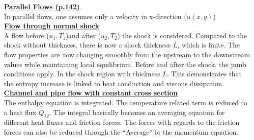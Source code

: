 \documentclass[8pt, landscape, fleqn]{scrartcl}
\begin{document}
\begin{multicols*}{3}
\underline{\textbf{Parallel Flows (p.142)}}\\
In parallel flows, one assumes only a velocity in x-direction ($u(x,y)$) \\

\underline{\textbf{Flow through normal shock}}\\
A flow before (${u_1,T_1}$)and after (${u_2,T_2}$) the shock is considered. Compared to the shock without thickness, there is now a shock thickness $L$, which is finite. The flow properties are now changing smoothly from the upstream to the downstream values while maintaining local equilibrium. Before and after the shock, the jumb conditions apply. In the shock region with thickness $L$. This demonstrates that the entropy increase is linked to heat conduction and viscous dissipation. \\

\underline{\textbf{Channel and pipe flow with constant cross section}}\\
The enthalpy equation is integrated. The temperature related term is reduced to a heat flux $\dot{Q}_{12}$. The integral basically becomes an averaging equation for different heat fluxes and friction forces. The forces with regards to the friction forces can also be reduced through the ``Average'' fo the momentum equation. \\


\end{multicols*}
\end{document}
